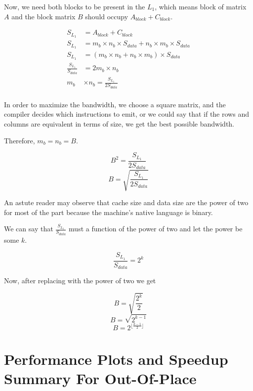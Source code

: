 Now, we need both blocks to be present in the $L_1$, which means block of matrix $A$
and the block matrix $B$ should occupy $A_{block} + C_{block}$.

\begin{align*}
    S_{L_1} &= A_{block} + C_{block}\\
    S_{L_1} &= m_b \times n_b \times S_{data} + n_b \times m_b \times S_{data}\\
    S_{L_1} &= (m_b \times n_b + n_b \times m_b) \times S_{data}\\
    \frac{S_{L_1}}{S_{data}} &= 2 m_b \times n_b \\
    m_b &\times n_b = \frac{S_{L_1}}{2S_{data}}\\
\end{align*}

In order to maximize the bandwidth, we choose a square matrix, 
and the compiler decides which instructions to emit, or we could 
say that if the rows and columns are equivalent in terms of size, 
we get the best possible bandwidth.

Therefore, $m_b = n_b = B$.

\[B^2 = \frac{S_{L_1}}{2S_{data}}\]
\[B = \sqrt{ \frac{S_{L_1}}{2S_{data}} }\]

An astute reader may observe that cache size and data size are the 
power of two for most of the part because the machine's native language is binary.

We can say that $\frac{S_{L_1}}{S_{data}}$ must a function of the power of two and 
let the power be some $k$.

\[\frac{S_{L_1}}{S_{data}} = 2^k\]

Now, after replacing with the power of two we get

\[B = \sqrt{ \frac{2^k}{2} }\]
\[B = \sqrt{ 2^{k - 1} }\]
\[B = 2^{\lfloor \frac{k - 1}{2} \rfloor}  \]

\clearpage

\section{Performance Plots and Speedup Summary For Out-Of-Place}

